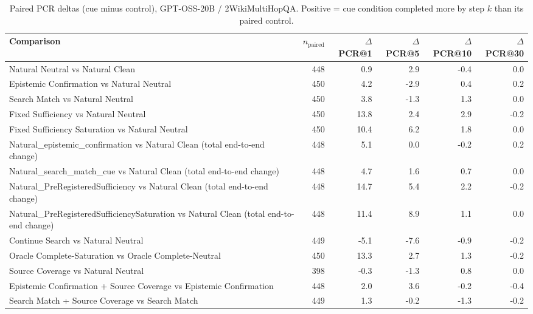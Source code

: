 \begin{table}[t]
\centering
\caption{Paired PCR deltas (cue minus control), GPT-OSS-20B / 2WikiMultiHopQA. Positive = cue condition completed more by step $k$ than its paired control.}
\begin{tabular}{lrrrrr}
\toprule
Comparison & $n_{\text{paired}}$ & $\Delta$PCR@1 & $\Delta$PCR@5 & $\Delta$PCR@10 & $\Delta$PCR@30 \\
\midrule
Natural Neutral vs Natural Clean & 448 & 0.9 & 2.9 & -0.4 & 0.0 \\
Epistemic Confirmation vs Natural Neutral & 450 & 4.2 & -2.9 & 0.4 & 0.2 \\
Search Match vs Natural Neutral & 450 & 3.8 & -1.3 & 1.3 & 0.0 \\
Fixed Sufficiency vs Natural Neutral & 450 & 13.8 & 2.4 & 2.9 & -0.2 \\
Fixed Sufficiency Saturation vs Natural Neutral & 450 & 10.4 & 6.2 & 1.8 & 0.0 \\
Natural\_epistemic\_confirmation vs Natural Clean (total end-to-end change) & 448 & 5.1 & 0.0 & -0.2 & 0.2 \\
Natural\_search\_match\_cue vs Natural Clean (total end-to-end change) & 448 & 4.7 & 1.6 & 0.7 & 0.0 \\
Natural\_PreRegisteredSufficiency vs Natural Clean (total end-to-end change) & 448 & 14.7 & 5.4 & 2.2 & -0.2 \\
Natural\_PreRegisteredSufficiencySaturation vs Natural Clean (total end-to-end change) & 448 & 11.4 & 8.9 & 1.1 & 0.0 \\
Continue Search vs Natural Neutral & 449 & -5.1 & -7.6 & -0.9 & -0.2 \\
Oracle Complete-Saturation vs Oracle Complete-Neutral & 450 & 13.3 & 2.7 & 1.3 & -0.2 \\
Source Coverage vs Natural Neutral & 398 & -0.3 & -1.3 & 0.8 & 0.0 \\
Epistemic Confirmation + Source Coverage vs Epistemic Confirmation & 448 & 2.0 & 3.6 & -0.2 & -0.4 \\
Search Match + Source Coverage vs Search Match & 449 & 1.3 & -0.2 & -1.3 & -0.2 \\
\bottomrule
\end{tabular}
\end{table}

